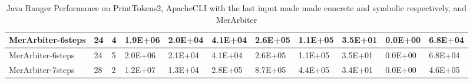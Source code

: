 \begin{table*}[]
\begin{tabular}{@{}lllllllllll@{}}
        MerArbiter-6steps                                        & 24                                                      & 4    & 1.9E+06                                                     & 2.0E+04                                                               & 4.1E+04                                                 & 2.6E+05                                                    & 1.1E+05                                                        & 3.5E+01                                                & 0.0E+00                                                   & 6.8E+04 \\ \midrule
        MerArbiter-6steps                                        & 24                                                      & 5    & 2.0E+06                                                     & 2.1E+04                                                               & 4.1E+04                                                 & 2.6E+05                                                    & 1.1E+05                                                        & 3.5E+01                                                & 0.0E+00                                                   & 6.8E+04 \\ \midrule
        MerArbiter-7steps                                        & 28                                                      & 2    & 1.2E+07                                                     & 1.3E+04                                                               & 2.8E+05                                                 & 8.7E+05                                                    & 4.4E+05                                                        & 3.4E+01                                                & 0.0E+00                                                   & 4.6E+05 \\ \bottomrule
    \end{tabular}
    \caption{Java Ranger Performance on PrintTokens2, ApacheCLI with the last input made made concrete and symbolic respectively, and MerArbiter}
    \label{table:results2}
\end{table*}